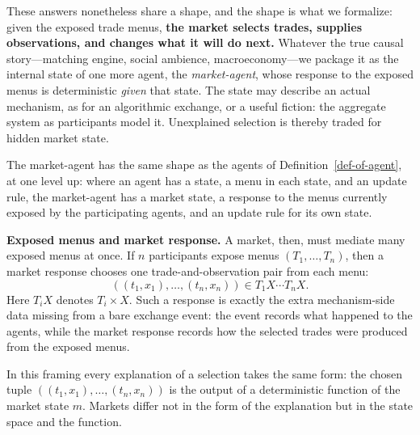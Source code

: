 \documentclass[11pt, one side, article]{memoir}
\theoremstyle{definition}
\theoremstyle{plain}
\newcommand{\0}{\textsf{0}}
\newcommand{\1}{\tn{\textsf{1}}}
\begin{document}
These answers nonetheless share a shape, and the shape is what we
formalize: given the exposed trade menus, \textbf{the market selects
trades, supplies observations, and changes what it will do next.}
Whatever the true causal story---matching engine, social ambience,
macroeconomy---we package it as the internal state of one more agent,
the \emph{market-agent}, whose response to the exposed menus is
deterministic \emph{given} that state.  The state may describe an
actual mechanism, as for an algorithmic exchange, or a useful fiction:
the aggregate system as participants model it.  Unexplained selection
is thereby traded for hidden market state.

The market-agent has the same shape as the agents of
Definition~\ref{def-of-agent}, at one level up: where an agent has a state,
a menu in each state, and an update rule, the market-agent has a market
state, a response to the menus currently exposed by the participating agents,
and an update rule for its own state.

\textbf{Exposed menus and market response.}
A market, then, must mediate many exposed menus at once.  If $n$ participants expose menus $(T_1,\ldots,T_n)$, then a market response chooses one trade-and-observation pair from each menu:
\[
((t_1,x_1),\ldots,(t_n,x_n))\in T_1X\cdots T_nX.
\]
Here $T_iX$ denotes $T_i\times X$.  Such a response is exactly the extra mechanism-side data missing from a bare exchange event: the event records what happened to the agents, while the market response records how the selected trades were produced from the exposed menus. 

In this framing every explanation of a selection takes the same form: the chosen tuple $((t_1,x_1),\ldots,(t_n,x_n))$ is the output of a deterministic function of the market state $m$.  Markets differ not in the form of the explanation but in the state space and the function.

\begin{center}
\end{center}
\end{document}
